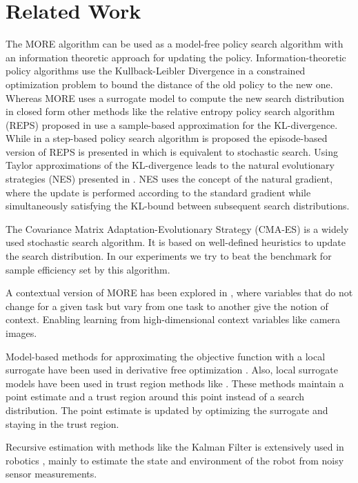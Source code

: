 
\chapter{Related Work}
The MORE algorithm can be used as a model-free policy
search algorithm with an information theoretic approach for
updating the policy.
Information-theoretic policy algorithms use
the Kullback-Leibler Divergence in a constrained optimization problem
to bound the distance of the old policy to the new one.
Whereas MORE uses a surrogate model to compute the new search distribution
in closed form other methods like
the relative entropy policy search algorithm (REPS)
proposed in \citet{peters2010relative} use a
sample-based approximation for the KL-divergence. While in
\citet{peters2010relative} a step-based policy search
algorithm is proposed the episode-based
version of REPS is presented in \citet{kupcsik2013data} which is equivalent
to stochastic search.
Using Taylor approximations of the KL-divergence leads to the
natural evolutionary strategies (NES)
presented in \citet{wierstra2014natural}. 
NES uses the concept of the natural gradient, where the update is performed
according to the standard gradient while simultaneously satisfying the
KL-bound between subsequent search distributions.

The Covariance Matrix Adaptation-Evolutionary Strategy (CMA-ES)
\citep{hansen2016cma}
is a widely used stochastic search algorithm. It is based on
well-defined heuristics to update the search distribution. In our experiments
we try to beat the benchmark for sample efficiency set by this algorithm.

A contextual version of MORE has been
explored in \citet{tangkaratt2017policy}, where
variables that do not change for a given task
but vary from one task to another
give the notion of context. Enabling
learning from high-dimensional
context variables like camera images.

Model-based methods for approximating the objective function
with a local surrogate have been used in
derivative free optimization \citet{nocedal2006numerical}.
Also, local surrogate models have been used in trust region
methods like \citet{powell2009bobyqa}.
These methods maintain a point estimate
and a trust region around this point instead
of a search distribution. The point estimate is updated by optimizing
the surrogate and staying in the trust region.

Recursive estimation with methods like
the Kalman Filter is extensively used in robotics \citep{chen2011kalman},
mainly to estimate the state and environment of the robot
from noisy sensor measurements.


